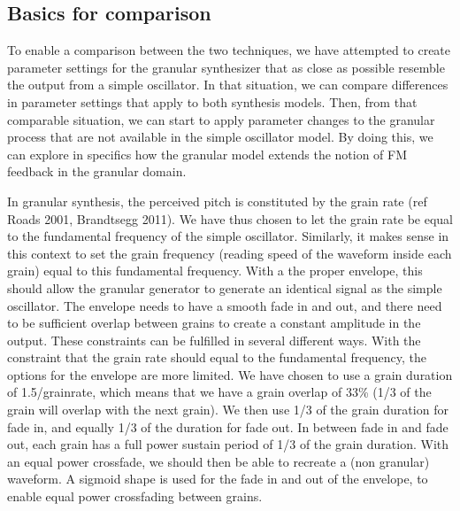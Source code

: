 \documentclass[runningheads,a4paper]{llncs}
\begin{document}
\subsection{Basics for comparison}
To enable a comparison between the two techniques, we have attempted to create parameter settings for the granular synthesizer that as close as possible resemble the output from a simple oscillator. In that situation, we can compare differences in parameter settings that apply to both synthesis models. Then, from that comparable situation, we can start to apply parameter changes to the granular process that are not available in the simple oscillator model. By doing this, we can explore in specifics how the granular model extends the notion of FM feedback in the granular domain.

In granular synthesis, the perceived pitch is constituted by the grain rate (ref Roads 2001, Brandtsegg 2011). We have thus chosen to let the grain rate be equal to the fundamental frequency of the simple oscillator. Similarly, it makes sense in this context to set the grain frequency (reading speed of the waveform inside each grain) equal to this fundamental frequency. With a the proper envelope, this should allow the granular generator to generate an identical signal as the simple oscillator. The envelope needs to have a smooth fade in and out, and there need to be sufficient overlap between grains to create a constant amplitude in the output. These constraints can be fulfilled in several different ways. With the constraint that the grain rate should equal to the fundamental frequency, the options for the envelope are more limited. We have chosen to use a grain duration of 1.5/grainrate, which means that we have a grain overlap of 33\% (1/3 of the grain will overlap with the next grain). We then use 1/3 of the grain duration for fade in, and equally 1/3 of the duration for fade out. In between fade in and fade out, each grain has a full power sustain period of 1/3 of the grain duration. With an equal power crossfade, we should then be able to recreate a (non granular) waveform. A sigmoid shape is used for the fade in and out of the envelope, to enable equal power crossfading between grains. 
\end{document}
